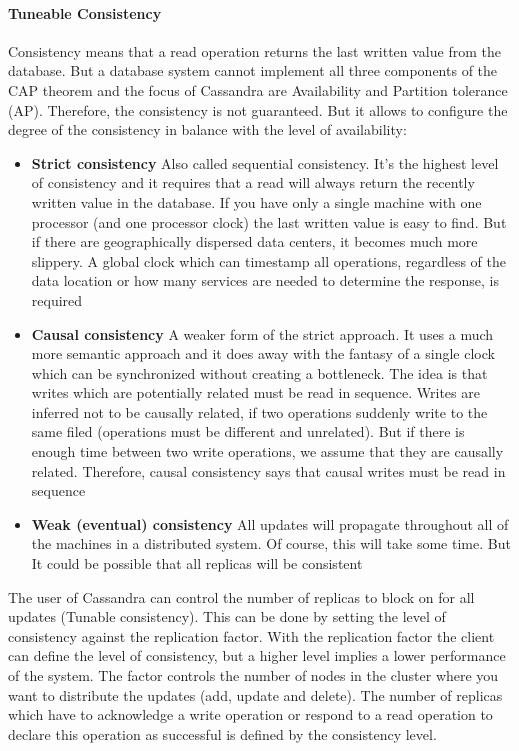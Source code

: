 \documentclass[a4paper]{article}
\begin{document}
\paragraph{Tuneable Consistency}
Consistency means that a read operation returns the last written value from the database. But a database system cannot implement all three components of the CAP theorem and the focus of Cassandra are Availability and Partition tolerance (AP). Therefore, the consistency is not guaranteed. But it allows to configure the degree of the consistency in balance with the level of availability: 
\begin{itemize}
	\item \textbf{Strict consistency} Also called sequential consistency. It's the highest level of consistency and it requires that a read will always return the recently written value in the database. If you have only a single machine with one processor (and one processor clock) the last written value is easy to find. But if there are geographically dispersed data centers, it becomes much more slippery. A global clock which can timestamp all operations, regardless of the data location or how many services are needed to determine the response, is required 
	\item \textbf{Causal consistency} A weaker form of the strict approach. It uses a much more semantic approach and it does away with the fantasy of a single clock which can be synchronized without creating a bottleneck. The idea is that writes which are potentially related must be read in sequence. Writes are inferred not to be causally related, if two operations suddenly write to the same filed (operations must be different and unrelated). But if there is enough time between two write operations, we assume that they are causally related. Therefore, causal consistency says that causal writes must be read in sequence 
	\item \textbf{Weak (eventual) consistency} All updates will propagate throughout all of the machines in a distributed system. Of course, this will take some time. But It could be possible that all replicas will be consistent 
\end{itemize}
The user of Cassandra can control the number of replicas to block on for all updates (Tunable consistency). This can be done by setting the level of consistency against the replication factor. With the replication factor the client can define the level of consistency, but a higher level implies a lower performance of the system. The factor controls the number of nodes in the cluster where you want to distribute the updates (add, update and delete). The number of replicas which have to acknowledge a write operation or respond to a read operation to declare this operation as successful is defined by the consistency level.
\end{document}
